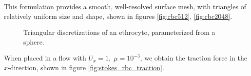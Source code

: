 This formulation provides a smooth, well-resolved surface mesh, with triangles of relatively uniform size and shape, shown in figures \ref{fig:rbc512}, \ref{fig:rbc2048}.

\begin{center}
\begin{figure}[h]
	\qquad
	\qquad
	\caption{Triangular discretizations of an ethrocyte, parameterized from a sphere.}
	\label{fig:glob_rbc}
\end{figure}
\end{center}

When placed in a flow with $U_x = 1,\; \mu=10^{-3}$, we obtain the traction force in the $x$-direction, shown in figure \ref{fig:stokes_rbc_traction}.

